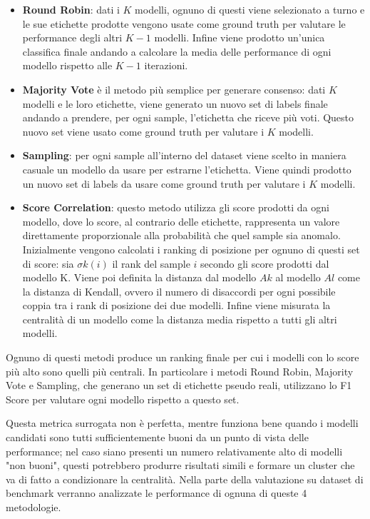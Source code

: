 \begin{itemize}
	\item \textbf{Round Robin}: dati i $K$ modelli, ognuno di questi viene selezionato a turno e le sue etichette prodotte vengono usate come ground truth per valutare le performance degli altri $K-1$ modelli. Infine viene prodotto un'unica classifica finale andando a calcolare la media delle performance di ogni modello rispetto alle $K-1$ iterazioni. 
	\item \textbf{Majority Vote} è il metodo più semplice per generare consenso: dati $K$ modelli e le loro etichette, viene generato un nuovo set di labels finale andando a prendere, per ogni sample, l'etichetta che riceve più voti. Questo nuovo set viene usato come ground truth per valutare i $K$ modelli.
	\item \textbf{Sampling}: per ogni sample all'interno del dataset viene scelto in maniera casuale un modello da usare per estrarne l'etichetta. Viene quindi prodotto un nuovo set di labels da usare come ground truth per valutare i $K$ modelli.
	\item \textbf{Score Correlation}: questo metodo utilizza gli score prodotti da ogni modello, dove lo score, al contrario delle etichette, rappresenta un valore direttamente proporzionale alla probabilità che quel sample sia anomalo. Inizialmente vengono calcolati i ranking di posizione per ognuno di questi set di score: sia ${\sigma}k(i)$ il rank del sample $i$ secondo gli score prodotti dal modello K. Viene poi definita la distanza dal modello $Ak$ al modello $Al$ come la distanza di Kendall, ovvero il numero di disaccordi per ogni possibile coppia tra i rank di posizione dei due modelli. Infine viene misurata la centralità di un modello come la distanza media rispetto a tutti gli altri modelli.
\end{itemize}

Ognuno di questi metodi produce un ranking finale per cui i modelli con lo score più alto sono quelli più centrali. In particolare i metodi Round Robin, Majority Vote e Sampling, che generano un set di etichette pseudo reali, utilizzano lo F1 Score per valutare ogni modello rispetto a questo set.

Questa metrica surrogata non è perfetta, mentre funziona bene quando i modelli candidati sono tutti sufficientemente buoni da un punto di vista delle performance; nel caso siano presenti un numero relativamente alto di modelli "non buoni", questi potrebbero produrre risultati simili e formare un cluster che va di fatto a condizionare la centralità.
Nella parte della valutazione su dataset di benchmark verranno analizzate le performance di ognuna di queste 4 metodologie.


